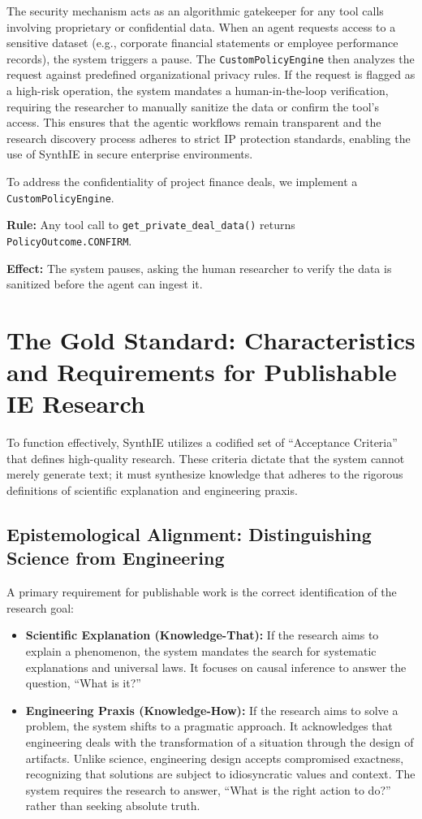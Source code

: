 \documentclass[12pt,a4paper]{article}
\begin{document}
The security mechanism acts as an algorithmic gatekeeper for any tool calls involving proprietary or confidential data. When an agent requests access to a sensitive dataset (e.g., corporate financial statements or employee performance records), the system triggers a pause. The \texttt{CustomPolicyEngine} then analyzes the request against predefined organizational privacy rules. If the request is flagged as a high-risk operation, the system mandates a human-in-the-loop verification, requiring the researcher to manually sanitize the data or confirm the tool's access. This ensures that the agentic workflows remain transparent and the research discovery process adheres to strict IP protection standards, enabling the use of SynthIE in secure enterprise environments.

To address the confidentiality of project finance deals, we implement a \texttt{CustomPolicyEngine}.

\textbf{Rule:} Any tool call to \texttt{get\_private\_deal\_data()} returns \texttt{PolicyOutcome.CONFIRM}.

\textbf{Effect:} The system pauses, asking the human researcher to verify the data is sanitized before the agent can ingest it.

\section{The Gold Standard: Characteristics and Requirements for Publishable IE Research}

To function effectively, SynthIE utilizes a codified set of ``Acceptance Criteria'' that defines high-quality research. These criteria dictate that the system cannot merely generate text; it must synthesize knowledge that adheres to the rigorous definitions of scientific explanation and engineering praxis.

\subsection{Epistemological Alignment: Distinguishing Science from Engineering}

A primary requirement for publishable work is the correct identification of the research goal:

\begin{itemize}[leftmargin=*]
    \item \textbf{Scientific Explanation (Knowledge-That):} If the research aims to explain a phenomenon, the system mandates the search for systematic explanations and universal laws. It focuses on causal inference to answer the question, ``What is it?''
    
    \item \textbf{Engineering Praxis (Knowledge-How):} If the research aims to solve a problem, the system shifts to a pragmatic approach. It acknowledges that engineering deals with the transformation of a situation through the design of artifacts. Unlike science, engineering design accepts compromised exactness, recognizing that solutions are subject to idiosyncratic values and context. The system requires the research to answer, ``What is the right action to do?'' rather than seeking absolute truth.
\end{itemize}
\end{document}
